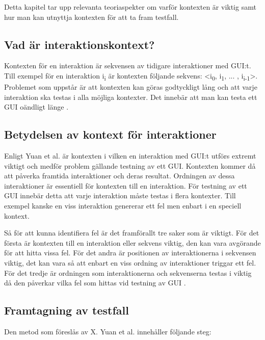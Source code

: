 Detta kapitel tar upp relevanta teoriaspekter om varför kontexten är viktig samt hur man kan utnyttja kontexten för att ta fram testfall.

\subsection{Vad är interaktionskontext?}

Kontexten för en interaktion är sekvensen av tidigare interaktioner med GUI:t. Till exempel för en interaktion i\textsubscript{i} är kontexten följande sekvens: <i\textsubscript{0}, i\textsubscript{1},  ... , i\textsubscript{i-1}>. Problemet som uppstår är att kontexten kan göras godtyckligt lång och att varje interaktion ska testas i alla möjliga kontexter. Det innebär att man kan testa ett GUI oändligt länge \cite{yuan2011gui}. 

\subsection{Betydelsen av kontext för interaktioner}

Enligt Yuan et al. \cite{yuan2011gui} är kontexten i vilken en interaktion med GUI:t utförs extremt viktigt och medför problem gällande testning av ett GUI. Kontexten kommer då att påverka framtida interaktioner och deras resultat. Ordningen av dessa interaktioner är essentiell för kontexten till en interaktion. För testning av ett GUI innebär detta att varje interaktion måste testas i flera kontexter. Till exempel kanske en viss interaktion genererar ett fel men enbart i en speciell kontext.

Så för att kunna identifiera fel är det framförallt tre saker som är viktigt. För det första är kontexten till en interaktion eller sekvens viktig, den kan vara avgörande för att hitta vissa fel. För det andra är positionen av interaktionerna i sekvensen viktig, det kan vara så att enbart en viss ordning av interaktioner triggar ett fel. För det tredje är ordningen som interaktionerna och sekvenserna testas i viktig då den påverkar vilka fel som hittas vid testning av GUI \cite{yuan2011gui}.

\subsection{Framtagning av testfall}
\label{sec:testcase-holmberg}

Den metod som föreslås av X. Yuan et al. \cite{yuan2011gui} innehåller följande steg:

